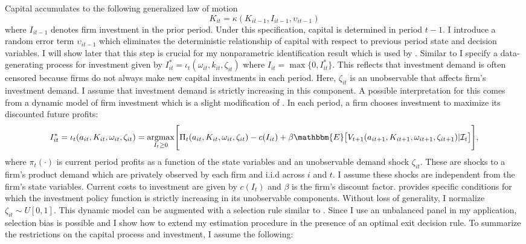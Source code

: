 \documentclass{article}
\begin{document}
Capital accumulates to the following generalized law of motion
\begin{equation} \label{modelK}
K_{it}=\kappa(K_{it-1}, I_{it-1}, \upsilon_{it-1})
\end{equation}
where $I_{it-1}$ denotes firm investment in the prior period. Under this specification, capital is determined in period $t-1$. I introduce a random error term $\upsilon_{it-1}$ which eliminates the deterministic relationship of capital with respect to previous period state and decision variables. I will show later that this step is crucial for my nonparametric identification result which is used by \cite{Hu2019}. Similar to \cite{Hu2019} I specify a data-generating process for investment given by $I^{*}_{it}=\iota_{t}(\omega_{it}, k_{it}, \zeta_{it})$ where $I_{it}=\max\{0, I^{*}_{it}\}$. This reflects that investment demand is often censored because firms do not always make new capital investments in each period. Here, $\zeta_{it}$ is an unobservable that affects firm's investment demand. I assume that investment demand is strictly increasing in this component. A possible interpretation for this comes from a dynamic model of firm investment which is a slight modification of \cite{Ericson1995}. In each period, a firm chooses investment to maximize its discounted future profits:
\begin{equation} \label{valuefn}
I^{*}_{it}=\iota_{t}(a_{it}, K_{it}, \omega_{it}, \zeta_{it})=\underset{I_{t}\geq 0}{\operatorname{argmax}}\Bigg[\Pi_{t}(a_{it}, K_{it}, \omega_{it}, \zeta_{it})-c(I_{it})+\beta\mathbbm{E}\big[V_{t+1}(a_{it+1}, K_{it+1}, \omega_{it+1}, \zeta_{it+1})|\mathcal{I}_{t}\big]\Bigg],
\end{equation}
where $\pi_{t}(\cdot)$ is current period profits as a function of the state variables and an unobservable demand shock $\zeta_{it}$. These are shocks to a firm's product demand which are privately observed by each firm and i.i.d across $i$ and $t$. I assume these shocks are independent from the firm's state variables. Current costs to investment are given by $c(I_{t})$ and $\beta$ is the firm's discount factor. \cite{Pakesa} provides specific conditions for which the investment policy function is strictly increasing in its unobservable components. Without loss of generality, I normalize $\zeta_{it}\sim U[0,1]$. This dynamic model can be augmented with a selection rule similar to \cite{Olley1996}. Since I use an unbalanced panel in my application, selection bias is possible and I show how to extend my estimation procedure in the presence of an optimal exit decision rule. To summarize the restrictions on the capital process and investment, I assume the following:
\end{document}
